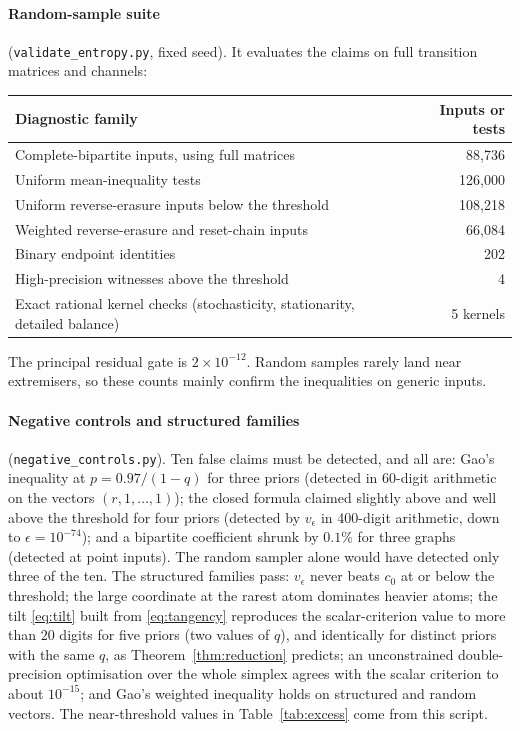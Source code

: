 \documentclass[11pt,a4paper]{article}
\numberwithin{equation}{section}
\theoremstyle{definition}
\theoremstyle{remark}
\begin{document}
\paragraph{Random-sample suite} (\texttt{validate\_entropy.py}, fixed seed).
It evaluates the claims on full transition matrices and channels:
\begin{center}
\small
\begin{tabular}{lr}
\toprule
Diagnostic family & Inputs or tests\\
\midrule
Complete-bipartite inputs, using full matrices & 88,736\\
Uniform mean-inequality tests & 126,000\\
Uniform reverse-erasure inputs below the threshold & 108,218\\
Weighted reverse-erasure and reset-chain inputs & 66,084\\
Binary endpoint identities & 202\\
High-precision witnesses above the threshold & 4\\
Exact rational kernel checks (stochasticity, stationarity, detailed balance) & 5 kernels\\
\bottomrule
\end{tabular}
\end{center}
The principal residual gate is \(2\times10^{-12}\). Random samples rarely
land near extremisers, so these counts mainly confirm the inequalities on
generic inputs.

\paragraph{Negative controls and structured families}
(\texttt{negative\_controls.py}). Ten false claims must be detected, and
all are: Gao's inequality at \(p=0.97/(1-q)\) for three priors (detected
in 60-digit arithmetic on the vectors \((r,1,\ldots,1)\)); the closed
formula claimed slightly above and well above the threshold for four priors
(detected by \(v_\epsilon\) in 400-digit arithmetic, down to
\(\epsilon=10^{-74}\)); and a bipartite coefficient shrunk by \(0.1\%\) for
three graphs (detected at point inputs). The random sampler alone would have
detected only three of the ten. The structured families pass: \(v_\epsilon\)
never beats \(c_0\) at or below the threshold; the large coordinate at the
rarest atom dominates heavier atoms; the tilt \eqref{eq:tilt} built from
\eqref{eq:tangency} reproduces the scalar-criterion value to more than
\(20\) digits for five priors (two values of \(q\)), and identically for
distinct priors with the same \(q\), as Theorem~\ref{thm:reduction}
predicts; an unconstrained double-precision optimisation over the whole
simplex agrees with the scalar criterion to about \(10^{-15}\); and Gao's
weighted inequality holds on structured and random vectors. The
near-threshold values in Table~\ref{tab:excess} come from this script.
\end{document}
